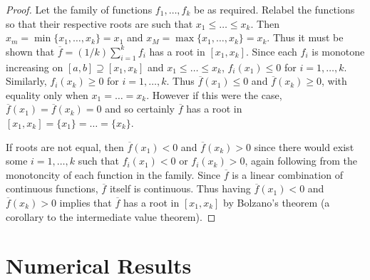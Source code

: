 \documentclass[12pt]{article}
\begin{document}
\begin{proof}
Let the family of functions $f_1,\ldots,f_k$ be as required. Relabel the functions so that their respective roots are such that $x_1 \leq \ldots \leq x_k$. Then $x_m = \min\{x_1,\ldots,x_k\} = x_1$ and $x_M = \max\{x_1,\ldots,x_k\} = x_k$. Thus it must be shown that $\overline{f} = (1/k)\sum_{i=1}^k f_i$ has a root in $[x_1,x_k]$. Since each $f_i$ is monotone increasing on $[a,b] \supseteq [x_1,x_k]$ and $x_1 \leq \ldots \leq x_k$, $f_i(x_1) \leq 0$ for $i = 1,\ldots,k$. Similarly, $f_i(x_k) \geq 0$ for $i = 1,\ldots,k$. Thus $\overline{f}(x_1) \leq 0$ and $\overline{f}(x_k) \geq 0$, with equality only when $x_1 = \ldots = x_k$. However if this were the case, $\overline{f}(x_1) = \overline{f}(x_k) = 0$ and so certainly $\overline{f}$ has a root in $[x_1,x_k] = \{x_1\} = \ldots = \{x_k\}$. \par 
If roots are not equal, then $\overline{f}(x_1) < 0$ and $\overline{f}(x_k) > 0$ since there would exist some $i = 1,\ldots,k$ such that $f_i(x_1) < 0$ or $f_i(x_k) > 0$, again following from the monotoncity of each function in the family. Since $\overline{f}$ is a linear combination of continuous functions, $\overline{f}$ itself is continuous. Thus having $\overline{f}(x_1) < 0$ and $\overline{f}(x_k) > 0$ implies that $\overline{f}$ has a root in $[x_1,x_k]$ by Bolzano's theorem (a corollary to the intermediate value theorem).
\end{proof}


\section{Numerical Results} \label{Numerical results}
\end{document}
